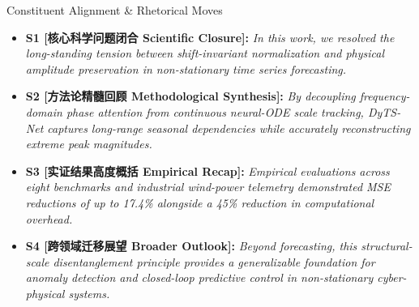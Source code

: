 \begin{TipBox}{Constituent Alignment \& Rhetorical Moves}
\begin{itemize}[leftmargin=1.5em]
  \item \textbf{S1 [核心科学问题闭合 Scientific Closure]:} \textit{In this work, we resolved the long-standing tension between shift-invariant normalization and physical amplitude preservation in non-stationary time series forecasting.}\par{}
  \item \textbf{S2 [方法论精髓回顾 Methodological Synthesis]:} \textit{By decoupling frequency-domain phase attention from continuous neural-ODE scale tracking, DyTS-Net captures long-range seasonal dependencies while accurately reconstructing extreme peak magnitudes.}\par{}
  \item \textbf{S3 [实证结果高度概括 Empirical Recap]:} \textit{Empirical evaluations across eight benchmarks and industrial wind-power telemetry demonstrated MSE reductions of up to 17.4\% alongside a 45\% reduction in computational overhead.}\par{}
  \item \textbf{S4 [跨领域迁移展望 Broader Outlook]:} \textit{Beyond forecasting, this structural-scale disentanglement principle provides a generalizable foundation for anomaly detection and closed-loop predictive control in non-stationary cyber-physical systems.}\par{}
\end{itemize}
\end{TipBox}
\bigskip
